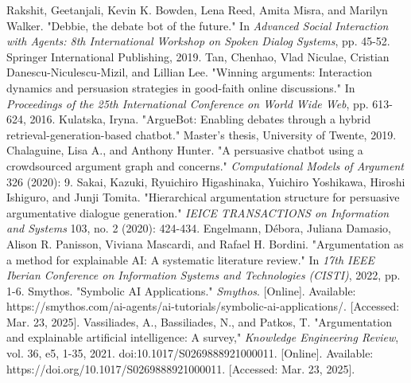 \documentclass[conference]{IEEEtran}
\begin{document}
\begin{thebibliography}{00}
 Rakshit, Geetanjali, Kevin K. Bowden, Lena Reed, Amita Misra, and Marilyn Walker. "Debbie, the debate bot of the future." In \textit{Advanced Social Interaction with Agents: 8th International Workshop on Spoken Dialog Systems}, pp. 45-52. Springer International Publishing, 2019.
 Tan, Chenhao, Vlad Niculae, Cristian Danescu-Niculescu-Mizil, and Lillian Lee. "Winning arguments: Interaction dynamics and persuasion strategies in good-faith online discussions." In \textit{Proceedings of the 25th International Conference on World Wide Web}, pp. 613-624, 2016.
 Kulatska, Iryna. "ArgueBot: Enabling debates through a hybrid retrieval-generation-based chatbot." Master's thesis, University of Twente, 2019.
 Chalaguine, Lisa A., and Anthony Hunter. "A persuasive chatbot using a crowdsourced argument graph and concerns." \textit{Computational Models of Argument} 326 (2020): 9.
 Sakai, Kazuki, Ryuichiro Higashinaka, Yuichiro Yoshikawa, Hiroshi Ishiguro, and Junji Tomita. "Hierarchical argumentation structure for persuasive argumentative dialogue generation." \textit{IEICE TRANSACTIONS on Information and Systems} 103, no. 2 (2020): 424-434.
 Engelmann, Débora, Juliana Damasio, Alison R. Panisson, Viviana Mascardi, and Rafael H. Bordini. "Argumentation as a method for explainable AI: A systematic literature review." In \textit{17th IEEE Iberian Conference on Information Systems and Technologies (CISTI)}, 2022, pp. 1-6.
 Smythos. "Symbolic AI Applications." \textit{Smythos}. [Online]. Available: https://smythos.com/ai-agents/ai-tutorials/symbolic-ai-applications/. [Accessed: Mar. 23, 2025].
 Vassiliades, A., Bassiliades, N., and Patkos, T. "Argumentation and explainable artificial intelligence: A survey," \textit{Knowledge Engineering Review}, vol. 36, e5, 1-35, 2021. doi:10.1017/S0269888921000011. [Online]. Available: https://doi.org/10.1017/S0269888921000011. [Accessed: Mar. 23, 2025].

\end{thebibliography}
\end{document}
